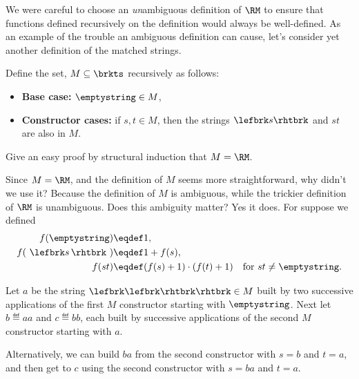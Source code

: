 \begin{definition}
We were careful to choose an \emph{un}ambiguous definition of $\RM$ to
ensure that functions defined recursively on the definition would always
be well-defined.  As an example of the trouble an ambiguous definition can
cause, let's consider yet another definition of the matched strings.

\begin{example}\label{M}
  Define the set, $M \subseteq \brkts$ recursively as follows:
\begin{itemize}

\item \textbf{Base case:} $\emptystring \in M$,

\item \textbf{Constructor cases:} if $s,t \in M$, then
  the strings $\lefbrk s\rhtbrk$ and $st$ are also in $M$.
\end{itemize}
\end{example}

\begin{notesproblem}
Give an easy proof by structural induction that $M =\RM$.
\end{notesproblem}

Since $M = \RM$, and the definition of $M$ seems more straightforward, why
didn't we use it?  Because the definition of $M$ is ambiguous, while the
trickier definition of $\RM$ is unambiguous.  Does this ambiguity matter?
Yes it does.  For suppose we defined
\begin{align*}
  f(\emptystring)        & \eqdef 1,\\
  f(\ \lefbrk s\,\rhtbrk\ ) & \eqdef 1+ f(s),\\
  f(st)                  & \eqdef (f(s)+1) \cdot (f(t)+1)
                            & \text{for } st\neq \emptystring.
\end{align*}

Let $a$ be the string $\lefbrk\lefbrk\rhtbrk\rhtbrk \in M$ built by two successive
applications of the first $M$ constructor starting with $\emptystring$.  Next
let $b \eqdef aa$ and $c \eqdef bb$, each built by successive applications
of the second $M$ constructor starting with $a$.

Alternatively, we can build $ba$ from the second constructor with $s=b$
and $t=a$, and then get to $c$ using the second constructor with $s=ba$
and $t=a$.


\end{definition}

